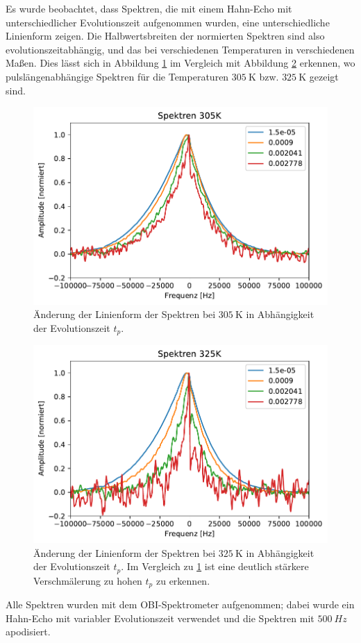 Es wurde beobachtet, dass Spektren, die mit einem Hahn-Echo mit unterschiedlicher Evolutionszeit aufgenommen wurden, eine unterschiedliche Linienform zeigen. Die Halbwertsbreiten der normierten Spektren sind also evolutionszeitabhängig, und das bei verschiedenen Temperaturen in verschiedenen Maßen. Dies lässt sich in Abbildung \ref{fig:res:spekdyn_305K} im Vergleich mit Abbildung \ref{fig:res:spekdyn_325K} erkennen, wo pulslängenabhängige Spektren für die Temperaturen $\SI{305}{\kelvin}$ bzw. $\SI{325}{\kelvin}$ gezeigt sind.
\begin{figure}
	\begin{center}
		\includegraphics[width=.8\textwidth]{graphics/plots/SPEKDYN/spekdyn_305K.pdf}
	\end{center}
	\caption{Änderung der Linienform der Spektren bei $\SI{305}{\kelvin}$ in Abhängigkeit der Evolutionszeit $t_p$.} \label{fig:res:spekdyn_305K}
\end{figure}
\begin{figure}
	\begin{center}
		\includegraphics[width=.8\textwidth]{graphics/plots/SPEKDYN/spekdyn_325K.pdf}
	\end{center}
	\caption{Änderung der Linienform der Spektren bei $\SI{325}{\kelvin}$ in Abhängigkeit der Evolutionszeit $t_p$. Im Vergleich zu \ref{fig:res:spekdyn_305K} ist eine deutlich stärkere Verschmälerung zu hohen $t_p$ zu erkennen.} \label{fig:res:spekdyn_325K}
\end{figure}
Alle Spektren wurden mit dem OBI-Spektrometer aufgenommen; dabei wurde ein Hahn-Echo mit variabler Evolutionszeit verwendet und die Spektren mit $\SI{500}{Hz}$ apodisiert.


